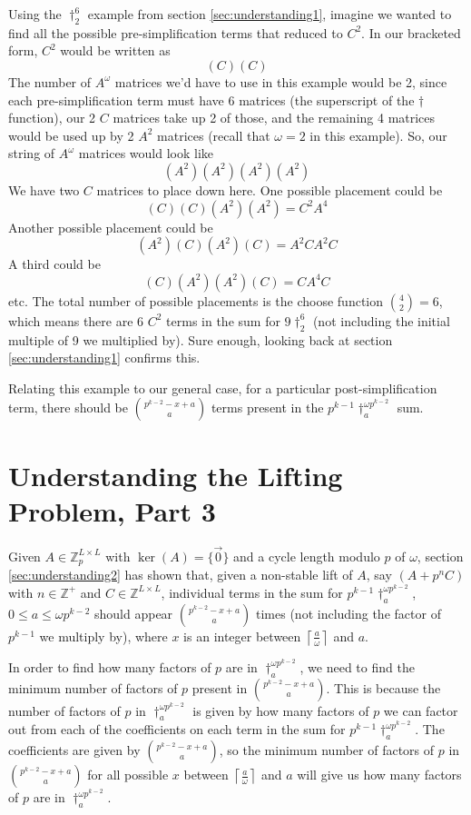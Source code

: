 \documentclass[a4paper, 12pt, reqno]{amsart}
\newcommand\ceil[1]{\left\lceil #1 \right\rceil}
\begin{document}
		Using the $\dag_2^6$ example from section \ref{sec:understanding1}, imagine we wanted to find all the possible pre-simplification terms that reduced to $C^2$. In our
		bracketed form, $C^2$ would be written as
		\[
			(C)(C)
		\]
		The number of $A^\omega$ matrices we'd have to use in this example would be 2, since each pre-simplification term must have 6 matrices (the superscript of the 
		$\dag$ function), our 2 $C$ matrices take up 2 of those, and the remaining 4 matrices would be used up by 2 $A^2$ matrices (recall that $\omega = 2$ in this example).
		So, our string of $A^\omega$ matrices would look like
		\[
			(A^2)(A^2)(A^2)(A^2)
		\]
		We have two $C$ matrices to place down here. One possible placement could be
		\[
			(C)(C)(A^2)(A^2) = C^2A^4
		\]
		Another possible placement could be
		\[
			(A^2)(C)(A^2)(C) = A^2CA^2C
		\]
		A third could be
		\[
			(C)(A^2)(A^2)(C) = CA^4C
		\]
		etc. The total number of possible placements is the choose function $\binom{4}{2} = 6$, which means there are 6 $C^2$ terms in the sum for $9\dag_2^6$ (not 
		including the initial multiple of 9 we multiplied by). Sure enough, looking back at section \ref{sec:understanding1} confirms this.
		
		Relating this example to our general case, for a particular post-simplification term, there should be $\binom{p^{k-2} - x + a}{a}$ terms present in the 
		$p^{k-1}\dag_a^{\omega p^{k-2}}$ sum.
		
	\section{Understanding the Lifting Problem, Part 3}
		\label{sec:understanding3}
		Given $A \in \mathds{Z}_p^{L \times L}$ with $\ker(A) = \{\vec{0}\}$ and a cycle length modulo $p$ of $\omega$, section \ref{sec:understanding2} has shown that, given
		a non-stable lift of $A$, say $(A + p^nC)$ with $n \in \mathds{Z}^+$ and $C \in \mathds{Z}^{L \times L}$, individual terms in the sum for 
		$p^{k-1}\dag_a^{\omega p^{k-2}}$, $0 \leq a \leq \omega p^{k-2}$ should appear $\binom{p^{k-2}-x+a}{a}$ times (not including the factor of $p^{k-1}$ we multiply by), 
		where $x$ is an integer between $\ceil{\frac{a}{\omega}}$ and $a$.
		
		In order to find how many factors of $p$ are in $\dag_a^{\omega p^{k-2}}$, we need to find the minimum number of factors of $p$ present in $\binom{p^{k-2}-x+a}{a}$.
		This is because the number of factors of $p$ in $\dag_a^{\omega p^{k-2}}$ is given by how many factors of $p$ we can factor out from each of the coefficients on each 
		term in the sum for $p^{k-1}\dag_a^{\omega p^{k-2}}$. The coefficients are given by $\binom{p^{k-2}-x+a}{a}$, so the minimum number of factors of $p$ in 
		$\binom{p^{k-2}-x+a}{a}$ for all possible $x$ between $\ceil{\frac{a}{\omega}}$ and $a$ will give us how many factors of $p$ are in $\dag_a^{\omega p^{k-2}}$.
		
\end{document}
